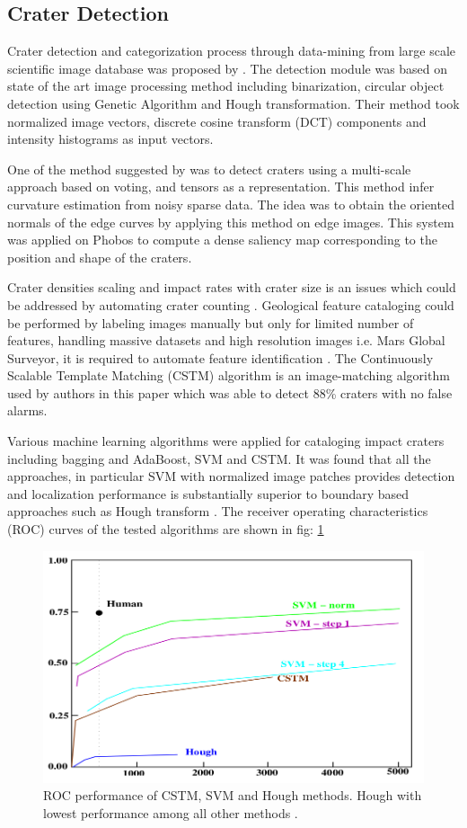 \documentclass[11pt]{article}
\begin{document}
\subsection{Crater Detection}
Crater detection and categorization process through data-mining from large scale scientific image database was proposed by \cite{honda2000crater}. The detection module was based on state of the art image processing method including binarization, circular object detection using Genetic Algorithm and Hough transformation. Their method took normalized image vectors, discrete cosine transform (DCT) components and intensity histograms as input vectors.

One of the method suggested by \cite{leroy2001crater} was to detect craters using a multi-scale approach based on voting, and tensors as a representation. This method infer curvature estimation from noisy sparse data. The idea was to obtain the oriented normals of the edge curves by applying this method on edge images. This system was applied on Phobos to compute a dense saliency map corresponding to the position and shape of the craters.

Crater densities scaling and impact rates with crater size is an issues which could be addressed by automating crater counting \cite{vinogradova2002training}. Geological feature cataloging could be performed by labeling images manually but only for limited number of features, handling massive datasets and high resolution images i.e. Mars Global Surveyor, it is required to automate feature identification \cite{vinogradova2002training}. The Continuously Scalable Template Matching (CSTM) algorithm is an image-matching algorithm used by authors in this paper which was able to detect 88\% craters with no false alarms.

Various machine learning algorithms were applied for cataloging impact craters including bagging and AdaBoost, SVM and CSTM. It was found that all the approaches, in particular SVM with normalized image patches provides detection and localization performance is substantially superior to boundary based approaches such as Hough transform  \cite{wetzler2005learning}. The receiver operating characteristics (ROC) curves of the tested algorithms are shown in fig: \ref{roc,wetzler}

\begin{figure}[ht!]
	\centering
	\includegraphics[width=.6\textwidth]{files/literature/roc_wetzler.png}
	\caption{ROC performance of CSTM, SVM and Hough methods. Hough with lowest performance among all other methods \cite{wetzler2005learning}.}
	\label{roc,wetzler}
\end{figure}
\end{document}
